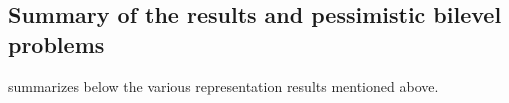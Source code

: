 \documentclass{article}
\theoremstyle{plain}
\theoremstyle{definition}
\begin{document}


\subsection{Summary of the results and pessimistic bilevel problems}
\label{subsection:summary_results}
 summarizes below the various representation results mentioned above.
\end{document}
